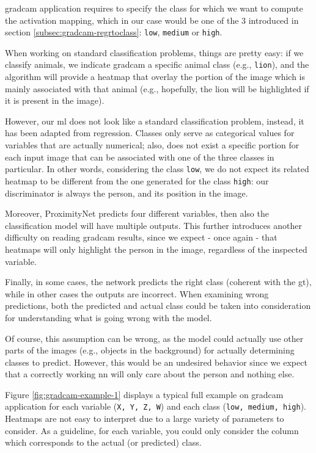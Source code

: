 \gls{gradcam} application requires to specify the class for which we want to compute the activation mapping, which in our case would be one of the 3 introduced in section \ref{subsec:gradcam-regrtoclass}: \texttt{low}, \texttt{medium} or \texttt{high}. 

When working on standard classification problems, things are pretty easy: if we classify animals, we indicate \gls{gradcam} a specific animal class (e.g., \texttt{lion}), and the algorithm will provide a heatmap that overlay the portion of the image which is mainly associated with that animal (e.g., hopefully, the lion will be highlighted if it is present in the image).

\medskip

However, our \gls{ml} does not look like a standard classification problem, instead, it has been adapted from regression. Classes only serve as categorical values for variables that are actually numerical; also, does not exist a specific portion for each input image that can be associated with one of the three classes in particular. In other words, considering the class \texttt{low}, we do not expect its related heatmap to be different from the one generated for the class \texttt{high}: our discriminator is always the person, and its position in the image.

Moreover, ProximityNet predicts four different variables, then also the classification model will have multiple outputs. This further introduces another difficulty on reading \gls{gradcam} results, since we expect - once again - that heatmaps will only highlight the person in the image, regardless of the inspected variable.

Finally, in some cases, the network predicts the right class (coherent with the \gls{gt}), while in other cases the outputs are incorrect. When examining wrong predictions, both the predicted and actual class could be taken into consideration for understanding what is going wrong with the model.

Of course, this assumption can be wrong, as the model could actually use other parts of the images (e.g., objects in the background) for actually determining classes to predict. However, this would be an undesired behavior since we expect that a correctly working \gls{nn} will only care about the person and nothing else.

\bigskip

Figure \ref{fig:gradcam-example-1} displays a typical full example on \gls{gradcam} application for each variable (\texttt{X, Y, Z, W}) and each class (\texttt{low, medium, high}). Heatmaps are not easy to interpret due to a large variety of parameters to consider. As a guideline, for each variable, you could only consider the column which corresponds to the actual (or predicted) class.

